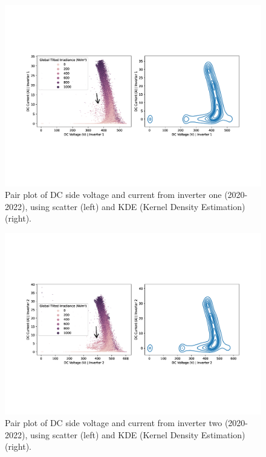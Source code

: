 \begin{figure}[h!]
    \centering
    \includegraphics[width=\textwidth,trim={0 5.5cm 0cm 5.5cm},clip]{figures/chapter5/analysis/04_voltage_current_pairplot_kb_1_annotated.pdf}
    \caption{Pair plot of DC side voltage and current from inverter one (2020-2022), using scatter (left) and KDE (Kernel Density Estimation) (right).}
    \label{fig:eda_volt_curr_pair_kb_1}
\end{figure}

\begin{figure}[h!]
    \centering
    \includegraphics[width=\textwidth,trim={0 5.5cm 0cm 5.5cm},clip]{figures/chapter5/analysis/06_voltage_current_pairplot_kb_2_annotated.pdf}
    \caption{Pair plot of DC side voltage and current from inverter two (2020-2022), using scatter (left) and KDE (Kernel Density Estimation) (right).}
    \label{fig:eda_volt_curr_pair_kb_2}
\end{figure}

